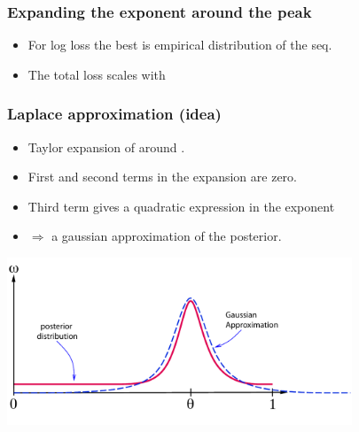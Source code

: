 \documentclass{beamer}
\begin{document}
\begin{frame}
\frametitle{Expanding the exponent around the peak}

\begin{itemize}
\item
For log loss the best \R{$\theta$} is empirical distribution
of the seq.
\R{\[
	\btheta = {\#\{x^t=1;\;\; 1 \leq t \leq T \} \over T} 
\]}
\item
The total loss scales with 
\R{\[
\TEloss{\theta} =
 T \cdot (\btheta \ell(\theta,1) + (1-\btheta)\ell(\theta,0))
 \doteq T \cdot g(\btheta,\theta)
\]}
\end{itemize}
\pause
{}
\end{frame}

\begin{frame}
\frametitle{Laplace approximation (idea)}
\begin{itemize}
\item Taylor expansion of  around \R{$\theta=\btheta$}.
\item
First and second terms in the expansion are zero.
\item
Third term gives a quadratic expression in the exponent
\item
$\Rightarrow$ a gaussian approximation of the posterior.
\end{itemize}
\pause
\includegraphics[height=5cm]{figures/Laplace.pdf}

\end{frame}
\end{document}
